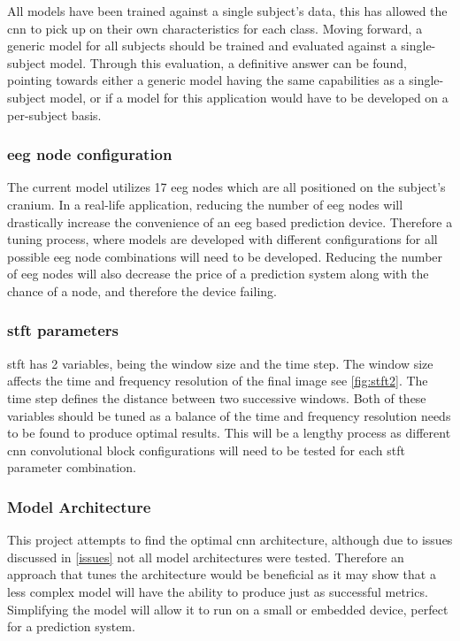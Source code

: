 \documentclass[12pt]{article}
\begin{document}
All models have been trained against a single subject's data, this has allowed the \acrshort{cnn} to pick up on their own characteristics for each class. Moving forward, a generic model for all subjects should be trained and evaluated against a single-subject model. Through this evaluation, a definitive answer can be found, pointing towards either a generic model having the same capabilities as a single-subject model, or if a model for this application would have to be developed on a per-subject basis.

\subsubsection{\acrshort{eeg} node configuration}

The current model utilizes 17 \acrshort{eeg} nodes which are all positioned on the subject's cranium. In a real-life application, reducing the number of \acrshort{eeg} nodes will drastically increase the convenience of an \acrshort{eeg} based prediction device. Therefore a tuning process, where models are developed with different configurations for all possible \acrshort{eeg} node combinations will need to be developed. Reducing the number of \acrshort{eeg} nodes will also decrease the price of a prediction system along with the chance of a node, and therefore the device failing.

\subsubsection{\acrshort{stft} parameters}

\acrshort{stft} has 2 variables, being the window size and the time step. The window size affects the time and frequency resolution of the final image see \ref{fig:stft2}. The time step defines the distance between two successive windows. Both of these variables should be tuned as a balance of the time and frequency resolution needs to be found to produce optimal results. This will be a lengthy process as different \acrshort{cnn} convolutional block configurations will need to be tested for each \acrshort{stft} parameter combination.



\subsubsection{Model Architecture}

This project attempts to find the optimal \acrshort{cnn} architecture, although due to issues discussed in \ref{issues} not all model architectures were tested. Therefore an approach that tunes the architecture would be beneficial as it may show that a less complex model will have the ability to produce just as successful metrics. Simplifying the model will allow it to run on a small or embedded device, perfect for a prediction system.
\end{document}
